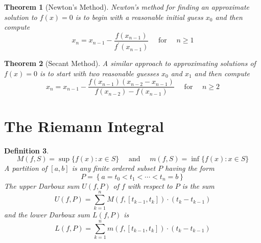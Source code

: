 \documentclass[12pt]{article}
\newtheorem{theorem}{Theorem}[section]
\newtheorem{definition}[theorem]{Definition}
\begin{document}
\begin{theorem}[Newton's Method]
	Newton's method for finding an approximate solution to $f ( x ) = 0$ is
	to begin with a reasonable initial guess $x _ { 0 }$ and then compute
	$$
	x _ { n } = x _ { n - 1 } - \frac { f \left( x _ { n - 1 } \right) } { f ^ { \prime } \left( x _ { n - 1 } \right) } \quad \text { for } \quad n \geq 1
	$$
\end{theorem}


\begin{theorem}[Secant Method]
	A similar approach to approximating solutions of $f ( x ) = 0$ is to start
	with two reasonable guesses $x _ { 0 }$ and $x _ { 1 }$ and then compute
	$$
	x _ { n } = x _ { n - 1 } - \frac { f \left( x _ { n - 1 } \right) \left( x _ { n - 2 } - x _ { n - 1 } \right) } { f \left( x _ { n - 2 } \right) - f \left( x _ { n - 1 } \right) } \quad \text { for } \quad n \geq 2
	$$
\end{theorem}
\section{The Riemann Integral}
\begin{definition}
	$$
	M ( f , S ) = \sup \{ f ( x ) : x \in S \} \quad \text { and } \quad m ( f , S ) = \inf \{ f ( x ) : x \in S \}
	$$
	A partition of $[ a , b ]$ is any finite ordered subset $P$ having the form $$
	P = \left\{ a = t _ { 0 } < t _ { 1 } < \cdots < t _ { n } = b \right\}
	$$
	The upper Darboux sum $U ( f , P )$ of $f$ with respect to $P$ is the sum $$
	U ( f , P ) = \sum _ { k = 1 } ^ { n } M \left( f , \left[ t _ { k - 1 } , t _ { k } \right] \right) \cdot \left( t _ { k } - t _ { k - 1 } \right)
	$$ and the lower Darboux sum $L ( f , P )$ is $$
	L ( f , P ) = \sum _ { k = 1 } ^ { n } m \left( f , \left[ t _ { k - 1 } , t _ { k } \right] \right) \cdot \left( t _ { k } - t _ { k - 1 } \right)
	$$
\end{definition}
\end{document}

